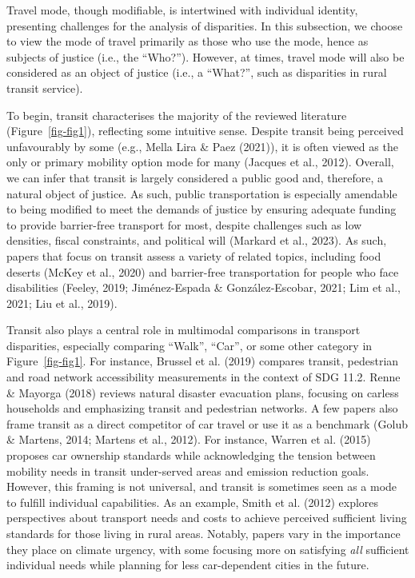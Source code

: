 \documentclass[
  letterpaper,
  DIV=11,
  numbers=noendperiod]{scrartcl}
\begin{document}
Travel mode, though modifiable, is intertwined with individual identity,
presenting challenges for the analysis of disparities. In this
subsection, we choose to view the mode of travel primarily as those who
use the mode, hence as subjects of justice (i.e., the ``Who?'').
However, at times, travel mode will also be considered as an object of
justice (i.e., a ``What?'', such as disparities in rural transit
service).

To begin, transit characterises the majority of the reviewed literature
(Figure~\ref{fig-fig1}), reflecting some intuitive sense. Despite
transit being perceived unfavourably by some (e.g., Mella Lira \& Paez
(2021)), it is often viewed as the only or primary mobility option mode
for many (Jacques et al., 2012). Overall, we can infer that transit is
largely considered a public good and, therefore, a natural object of
justice. As such, public transportation is especially amendable to being
modified to meet the demands of justice by ensuring adequate funding to
provide barrier-free transport for most, despite challenges such as low
densities, fiscal constraints, and political will (Markard et al.,
2023). As such, papers that focus on transit assess a variety of related
topics, including food deserts (McKey et al., 2020) and barrier-free
transportation for people who face disabilities (Feeley, 2019;
Jiménez-Espada \& González-Escobar, 2021; Lim et al., 2021; Liu et al.,
2019).

Transit also plays a central role in multimodal comparisons in transport
disparities, especially comparing ``Walk'', ``Car'', or some other
category in Figure~\ref{fig-fig1}. For instance, Brussel et al. (2019)
compares transit, pedestrian and road network accessibility measurements
in the context of SDG 11.2. Renne \& Mayorga (2018) reviews natural
disaster evacuation plans, focusing on carless households and
emphasizing transit and pedestrian networks. A few papers also frame
transit as a direct competitor of car travel or use it as a benchmark
(Golub \& Martens, 2014; Martens et al., 2012). For instance, Warren et
al. (2015) proposes car ownership standards while acknowledging the
tension between mobility needs in transit under-served areas and
emission reduction goals. However, this framing is not universal, and
transit is sometimes seen as a mode to fulfill individual capabilities.
As an example, Smith et al. (2012) explores perspectives about transport
needs and costs to achieve perceived sufficient living standards for
those living in rural areas. Notably, papers vary in the importance they
place on climate urgency, with some focusing more on satisfying
\emph{all} sufficient individual needs while planning for less
car-dependent cities in the future.
\end{document}
